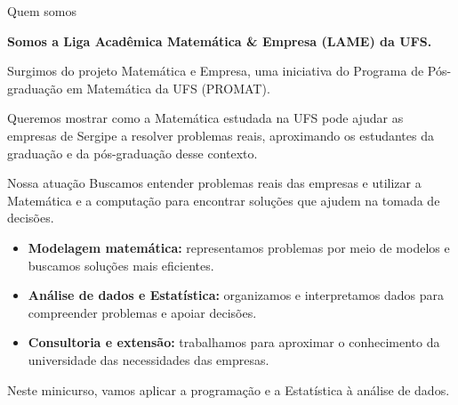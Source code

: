 
\begin{frame}[t]{Quem somos}
  \vspace{3mm}
  {\large\bfseries Somos a Liga Acadêmica Matemática \& Empresa (LAME) da UFS.\par}
  \bigskip
  Surgimos do projeto Matemática e Empresa, uma iniciativa do Programa de Pós-graduação em Matemática da UFS (PROMAT).
  \bigskip
  \begin{EMASCnote}
    Queremos mostrar como a Matemática estudada na UFS pode ajudar as empresas de Sergipe a resolver problemas reais, aproximando os estudantes da graduação e da pós-graduação desse contexto.
  \end{EMASCnote}
\end{frame}

\begin{frame}[t]{Nossa atuação}
  \vspace{3mm}
  Buscamos entender problemas reais das empresas e utilizar a Matemática e a computação para encontrar soluções que ajudem na tomada de decisões.
  \medskip
  \begin{itemize}
    \item \textbf{Modelagem matemática:} representamos problemas por meio de modelos e buscamos soluções mais eficientes.
    \item \textbf{Análise de dados e Estatística:} organizamos e interpretamos dados para compreender problemas e apoiar decisões.
    \item \textbf{Consultoria e extensão:} trabalhamos para aproximar o conhecimento da universidade das necessidades das empresas.
  \end{itemize}
  \begin{EMASCnote}
    Neste minicurso, vamos aplicar a programação e a Estatística à análise de dados.
  \end{EMASCnote}
\end{frame}

